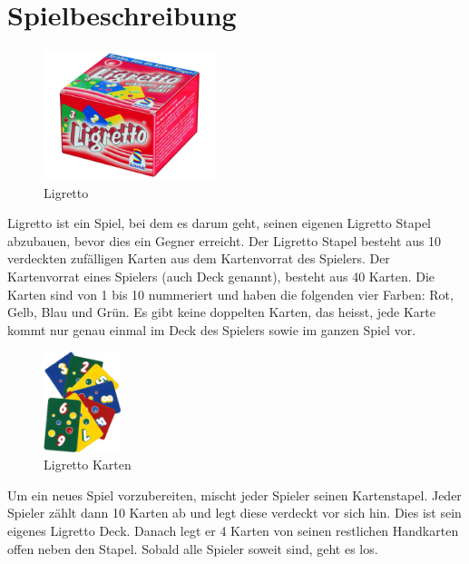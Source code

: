\section{Spielbeschreibung}

\begin{figure}[hbt]
  \centering
  \includegraphics[width=0.45\textwidth,angle=0]{graphics/ligretto.jpg}
  \caption{Ligretto \hfill{} }
 \end{figure}

Ligretto ist ein Spiel, bei dem es darum geht, seinen eigenen Ligretto Stapel abzubauen, bevor dies ein Gegner erreicht. Der Ligretto Stapel besteht aus 10 verdeckten zufälligen Karten aus dem Kartenvorrat des Spielers. Der Kartenvorrat eines Spielers (auch Deck genannt), besteht aus 40 Karten. Die Karten sind von 1 bis 10 nummeriert und haben die folgenden vier Farben: Rot, Gelb, Blau und Grün. Es gibt keine doppelten Karten, das heisst, jede Karte kommt nur genau einmal im Deck des Spielers sowie im ganzen Spiel vor.

\begin{figure}[hbt]
  \centering
  \includegraphics[width=0.20\textwidth,angle=0]{graphics/ligretto.png}
  \caption{Ligretto Karten \hfill{} }
\end{figure}

Um ein neues Spiel vorzubereiten, mischt jeder Spieler seinen Kartenstapel. Jeder Spieler zählt dann 10 Karten ab und legt diese verdeckt vor sich hin. Dies ist sein eigenes Ligretto Deck. Danach legt er 4 Karten von seinen restlichen Handkarten offen neben den Stapel. Sobald alle Spieler soweit sind, geht es los.

\newpage

